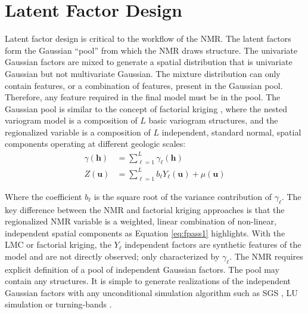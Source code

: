 
\FloatBarrier
\section{Latent Factor Design}
\label{sec:04factord}

Latent factor design is critical to the workflow of the \gls{NMR}. The latent factors form the Gaussian ``pool'' from which the \gls{NMR} draws structure. The univariate Gaussian factors are mixed to generate a spatial distribution that is univariate Gaussian but not multivariate Gaussian. The mixture distribution can only contain features, or a combination of features, present in the Gaussian pool. Therefore, any feature required in the final model must be in the pool. The Gaussian pool is similar to the concept of factorial kriging \citep{goovaerts1997geostatistics}, where the nested variogram model is a composition of $L$ basic variogram structures, and the regionalized variable is a composition of $L$ independent, standard normal, spatial components operating at different geologic scales:
\begin{align}
    \label{eq:gamma_comp}
    \gamma(\mathbf{h}) & = \sum_{\ell=1}^{L} \gamma_{\ell}(\mathbf{h})                     \\
    \label{eq:z_comp}
    Z(\mathbf{u})      & = \sum_{\ell=1}^{L}b_{\ell}Y_{\ell}(\mathbf{u}) + \mu(\mathbf{u})
\end{align}

Where the coefficient $b_{\ell}$ is the square root of the variance contribution of $\gamma_{\ell}$. The key difference between the \gls{NMR} and factorial kriging approaches is that the regionalized \gls{NMR} variable is a weighted, linear combination of non-linear, independent spatial components as Equation \ref{eq:fpass1} highlights. With the \gls{LMC} or factorial kriging, the $Y_{\ell}$ independent factors are synthetic features of the model and are not directly observed; only characterized by $\gamma_{\ell}$. The \gls{NMR} requires explicit definition of a pool of independent Gaussian factors. The pool may contain any structures. It is simple to generate realizations of the independent Gaussian factors with any unconditional simulation algorithm such as \gls{SGS} \citep{gomez-hernandez1993joint}, LU simulation \citep{davis1987production} or turning-bands \citep{journel1974geostatistics}.

